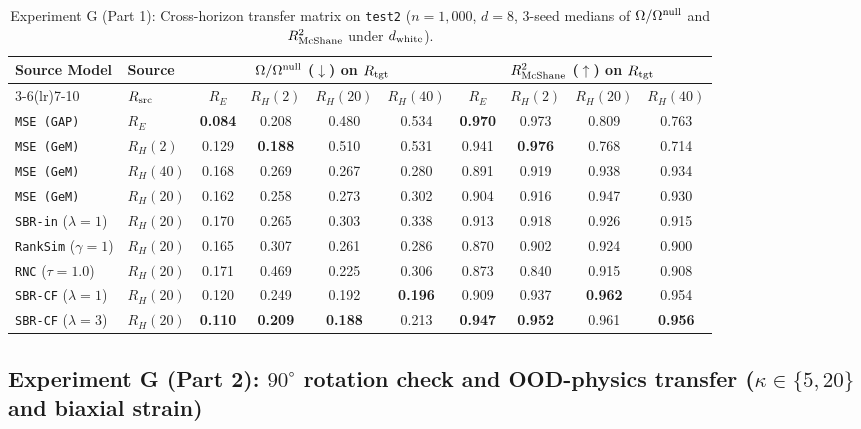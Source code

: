 \documentclass[preprint,11pt,a4paper]{elsarticle}
\begin{document}
\begin{table}[ht!]
\centering
\caption{Experiment G (Part 1): Cross-horizon transfer matrix on \texttt{test2} ($n=1{,}000$, $d=8$, 3-seed medians of $\Omega/\Omega^{\rm null}$ and $R^2_{\rm McShane}$ under $d_{\rm white}$).}
\label{tab:transfer_i16}
\footnotesize
\setlength{\tabcolsep}{4.0pt}
\begin{tabular}{llcccccccc}
\toprule
Source Model & Source & \multicolumn{4}{c}{$\Omega/\Omega^{\rm null}$ ($\downarrow$) on $R_{\rm tgt}$} & \multicolumn{4}{c}{$R^2_{\rm McShane}$ ($\uparrow$) on $R_{\rm tgt}$} \\
\cmidrule(lr){3-6}\cmidrule(lr){7-10}
 & $R_{\rm src}$ & $R_E$ & $R_H(2)$ & $R_H(20)$ & $R_H(40)$ & $R_E$ & $R_H(2)$ & $R_H(20)$ & $R_H(40)$ \\
\midrule
\texttt{MSE (GAP)} & $R_E$ & \textbf{0.084} & 0.208 & 0.480 & 0.534 & \textbf{0.970} & 0.973 & 0.809 & 0.763 \\
\texttt{MSE (GeM)} & $R_H(2)$ & 0.129 & \textbf{0.188} & 0.510 & 0.531 & 0.941 & \textbf{0.976} & 0.768 & 0.714 \\
\texttt{MSE (GeM)} & $R_H(40)$ & 0.168 & 0.269 & 0.267 & 0.280 & 0.891 & 0.919 & 0.938 & 0.934 \\
\midrule
\texttt{MSE (GeM)} & $R_H(20)$ & 0.162 & 0.258 & 0.273 & 0.302 & 0.904 & 0.916 & 0.947 & 0.930 \\
\texttt{SBR-in} ($\lambda=1$) & $R_H(20)$ & 0.170 & 0.265 & 0.303 & 0.338 & 0.913 & 0.918 & 0.926 & 0.915 \\
\texttt{RankSim} ($\gamma=1$) & $R_H(20)$ & 0.165 & 0.307 & 0.261 & 0.286 & 0.870 & 0.902 & 0.924 & 0.900 \\
\texttt{RNC} ($\tau=1.0$) & $R_H(20)$ & 0.171 & 0.469 & 0.225 & 0.306 & 0.873 & 0.840 & 0.915 & 0.908 \\
\texttt{SBR-CF} ($\lambda=1$) & $R_H(20)$ & 0.120 & 0.249 & 0.192 & \textbf{0.196} & 0.909 & 0.937 & \textbf{0.962} & 0.954 \\
\texttt{SBR-CF} ($\lambda=3$) & $R_H(20)$ & \textbf{0.110} & \textbf{0.209} & \textbf{0.188} & 0.213 & \textbf{0.947} & \textbf{0.952} & 0.961 & \textbf{0.956} \\
\bottomrule
\end{tabular}
\end{table}

\subsection{Experiment G (Part 2): $90^\circ$ rotation check and OOD-physics transfer ($\kappa\in\{5,20\}$ and biaxial strain)}
\end{document}
